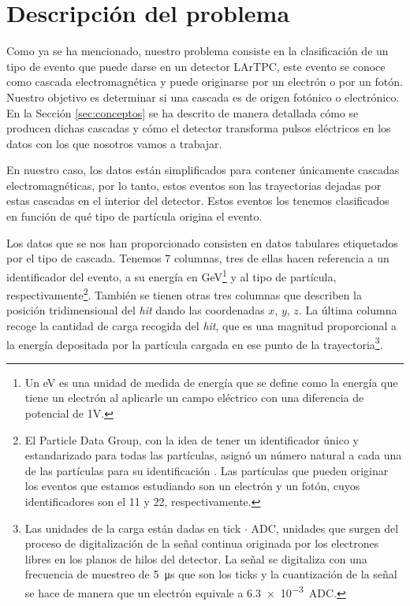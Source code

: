 \documentclass[a4paper,12pt,oneside,titlepage]{book}
\newcommand{\red}[1]{\textcolor{red}{#1}}
\begin{document}
\section{Descripción del problema}

Como ya se ha mencionado, nuestro problema consiste en la clasificación de un tipo de evento que puede darse en un detector LArTPC, este evento se conoce como cascada electromagnética y puede originarse por un electrón o por un fotón. Nuestro objetivo es determinar si una cascada es de origen fotónico o electrónico. En la Sección \ref{sec:conceptos} se ha descrito de manera detallada cómo se producen dichas cascadas y cómo el detector transforma pulsos eléctricos en los datos con los que nosotros vamos a trabajar.

En nuestro caso, los datos están simplificados para contener únicamente cascadas electromagnéticas, por lo tanto, estos eventos son las trayectorias dejadas por estas cascadas en el interior del detector. Estos eventos los tenemos clasificados en función de qué tipo de partícula origina el evento.


Los datos que se nos han proporcionado consisten en datos tabulares etiquetados por el tipo de cascada. Tenemos 7 columnas, tres de ellas hacen referencia a un identificador del evento, a su energía en GeV\footnote{Un eV es una unidad de medida de energía que se define como la energía que tiene un electrón al aplicarle un campo eléctrico con una diferencia de potencial de 1V.} y al tipo de partícula, respectivamente\footnote{El Particle Data Group, con la idea de tener un identificador único y estandarizado para todas las partículas, asignó un número natural a cada una de las partículas para su identificación \cite{datagroup}. Las partículas que pueden originar los eventos que estamos estudiando son un electrón y un fotón, cuyos identificadores son el 11 y 22, respectivamente.}.  También se tienen otras tres columnas que describen la posición tridimensional del \textit{hit} dando las coordenadas $x$, $y$, $z$. La última columna recoge la cantidad de carga recogida del \textit{hit}, que es una magnitud proporcional a la energía depositada por la partícula cargada en ese punto de la trayectoria\footnote{Las unidades de la carga están dadas en tick $\cdot$ ADC, unidades que surgen del proceso de digitalización de la señal continua originada por los electrones libres en los planos de hilos del detector. La señal se digitaliza con una frecuencia de muestreo de \SI{5}{\micro s} que son los ticks y la cuantización de la señal se hace de manera que un electrón equivale a \SI[]{6.3e-3}{ADC}.}. 
\end{document}
